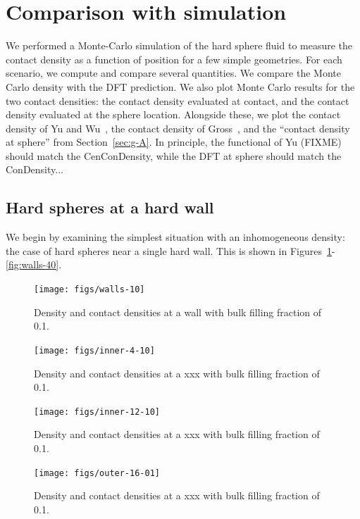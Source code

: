\documentclass[letterpaper,twocolumn,amsmath,amssymb,jcp,10pt,aip]{revtex4-1}
\begin{document}
\section{Comparison with simulation}

We performed a Monte-Carlo simulation of the hard sphere fluid to
measure the contact density as a function of position for a few simple
geometries.  For each scenario, we compute and compare several
quantities.  We compare the Monte Carlo density with the DFT
prediction.  We also plot Monte Carlo results for the two contact
densities: the contact density evaluated at contact, and the contact
density evaluated at the sphere location.  Alongside these, we plot
the contact density of Yu and
Wu~\cite{yu2002fmt-dft-inhomogeneous-associating}, the contact density
of Gross~\cite{gross2009density}, and the ``contact density at
sphere'' from Section~\ref{sec:g-A}.  In principle, the
functional of Yu (FIXME) should match the CenConDensity, while the DFT
at sphere should match the ConDensity...

\subsection{Hard spheres at a hard wall}

We begin by examining the simplest situation with an inhomogeneous
density:  the case of hard spheres near a single hard wall.  This is
shown in Figures~\ref{fig:walls-10}-\ref{fig:walls-40}.


\begin{figure}
  \texttt{[image: figs/walls-10]}
  \caption{Density and contact densities at a wall with bulk filling
    fraction of 0.1.}
  \label{fig:walls-10}
\end{figure}
\begin{figure}
  \texttt{[image: figs/inner-4-10]}
  \caption{Density and contact densities at a xxx with bulk filling
    fraction of 0.1.}
  \label{fig:inner-4-10}
\end{figure}
\begin{figure}
  \texttt{[image: figs/inner-12-10]}
  \caption{Density and contact densities at a xxx with bulk filling
    fraction of 0.1.}
  \label{fig:inner-12-10}
\end{figure}
\begin{figure}
  \texttt{[image: figs/outer-16-01]}
  \caption{Density and contact densities at a xxx with bulk filling
    fraction of 0.1.}
  \label{fig:outer-10}
\end{figure}
\end{document}
